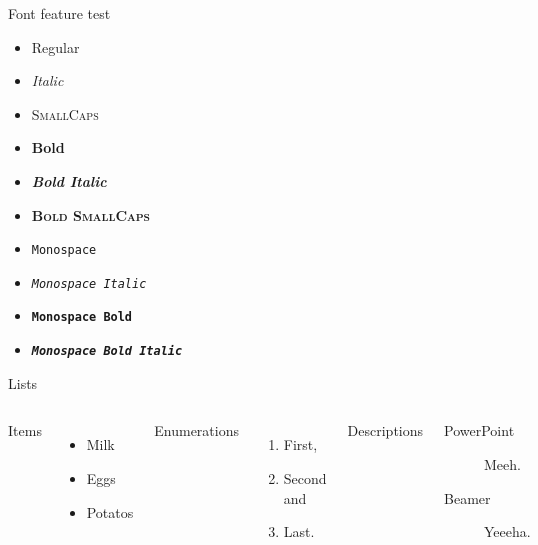 \documentclass[10pt]{beamer}
\begin{document}
\begin{frame}{Font feature test}
  \begin{itemize}
    \item Regular
    \item \textit{Italic}
    \item \textsc{SmallCaps}
    \item \textbf{Bold}
    \item \textbf{\textit{Bold Italic}}
    \item \textbf{\textsc{Bold SmallCaps}}
    \item \texttt{Monospace}
    \item \texttt{\textit{Monospace Italic}}
    \item \texttt{\textbf{Monospace Bold}}
    \item \texttt{\textbf{\textit{Monospace Bold Italic}}}
  \end{itemize}
\end{frame}

\begin{frame}{Lists}
  \begin{columns}[T,onlytextwidth]
      Items
      \begin{itemize}
        \item Milk \item Eggs \item Potatos
      \end{itemize}

      Enumerations
      \begin{enumerate}
        \item First, \item Second and \item Last.
      \end{enumerate}

      Descriptions
      \begin{description}
        \item[PowerPoint] Meeh. \item[Beamer] Yeeeha.
      \end{description}
  \end{columns}
\end{frame}
\end{document}
